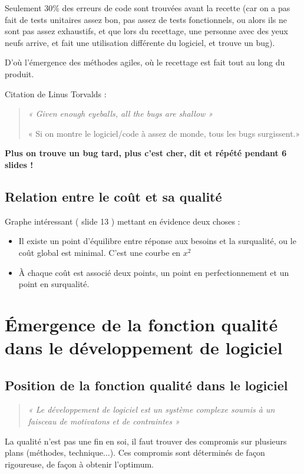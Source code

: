 Seulement 30\% des erreurs de code sont trouvées avant la recette (car on a pas fait de tests unitaires assez bon, pas assez de tests fonctionnels, ou alors ils ne sont pas assez exhaustifs, et que lors du recettage, une personne avec des yeux neufs arrive, et fait une utilisation différente du logiciel, et trouve un bug). 

D’où l'émergence des méthodes agiles, où le recettage est fait tout au long du produit.

 Citation de Linus Torvalds :
\begin{quote}
\em « Given enough eyeballs, all the bugs are shallow »

 « Si on montre le logiciel/code à assez de monde, tous les bugs surgissent.»
\end{quote}

\textbf{Plus on trouve un bug  tard, plus c'est cher, dit et répété pendant 6 slides !}

	\subsection{Relation entre le coût et sa qualité}

	Graphe intéressant ( slide 13 ) mettant en évidence deux choses :

	\begin{itemize}
    \item Il existe un point d'équilibre entre réponse aux besoins et la surqualité, ou le coût global est minimal. C’est une courbe en $x^2$
    \item À chaque coût est associé deux points, un point en perfectionnement et un point en surqualité.
	\end{itemize}



\section{Émergence de la fonction qualité dans le développement de logiciel}

	\subsection{Position de la fonction qualité dans le logiciel}
\begin{quote}
  \em  « Le développement de logiciel est un système complexe soumis à un faisceau de motivatons et de contraintes »
\end{quote}
La qualité n’est pas une fin en soi, il faut trouver des compromis sur plusieurs plans (méthodes, technique...). Ces compromis sont déterminés de façon rigoureuse, de façon à obtenir l’optimum.


